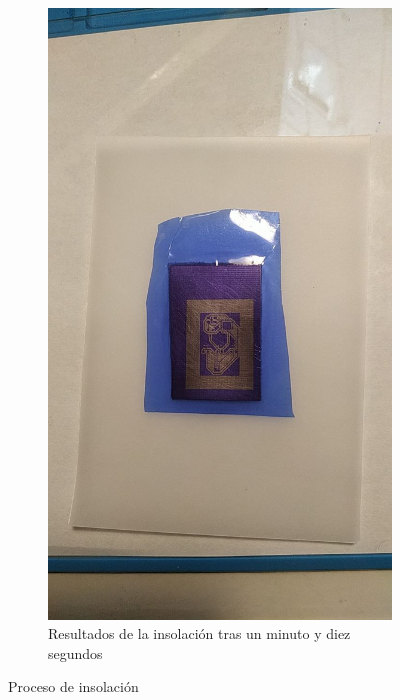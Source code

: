 \begin{figure}[!htb]
\begin{subfigure}[b]{.475\textwidth}
        \includegraphics[width=1\textwidth, trim={0 400 0 500}, clip]{tfg/figuras/06_prototipado/insolacion/resultado_insolacion.png}
        \caption{Resultados de la insolación tras un minuto y diez segundos}
        \label{fig:tfg:06:resultado_insolacion}
    \end{subfigure}%
    \caption{Proceso de insolación}
    \label{fig:tfg:06:aplicacion_pelicula}
\end{figure}


\pagebreak



